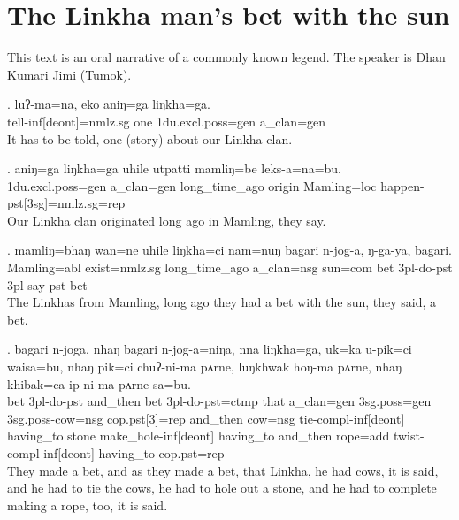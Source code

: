 ﻿%


\section*{The Linkha man's bet with the sun} 

\noindent This text is an oral narrative of a commonly known legend. The speaker is Dhan Kumari Jimi (Tumok).

\setcounter{ExNo}{0}

\exg. luʔ-ma=na, eko aniŋ=ga liŋkha=ga.\\
tell{\sc -inf[deont]=nmlz.sg} one {\sc 1du.excl.poss=gen} a\_clan{\sc=gen}\\
It has to be told, one (story) about our Linkha clan.


\exg. aniŋ=ga liŋkha=ga uhile utpatti mamliŋ=be leks-a=na=bu.\\
{\sc 1du.excl.poss=gen} a\_clan{\sc =gen} long\_time\_ago origin Mamling{\sc =loc} happen{\sc -pst[3sg]=nmlz.sg=rep}\\
Our Linkha clan originated long ago in Mamling, they say.


\exg. mamliŋ=bhaŋ wan=ne uhile liŋkha=ci nam=nuŋ bagari n-jog-a, ŋ-ga-ya, bagari.\\
Mamling{\sc =abl} exist{\sc [3sg]=nmlz.sg} long\_time\_ago a\_clan{\sc =nsg} {\sc sun=com} bet {\sc 3pl-}do{\sc -pst} {\sc 3pl-}say{\sc -pst} bet\\
The Linkhas from Mamling, long ago they had a bet with the sun, they said, a bet.


\exg. bagari n-joga, nhaŋ bagari n-jog-a=niŋa, nna liŋkha=ga, uk=ka u-pik=ci waisa=bu, nhaŋ pik=ci chuʔ-ni-ma pʌrne, luŋkhwak hoŋ-ma pʌrne, nhaŋ khibak=ca ip-ni-ma pʌrne sa=bu.\\
bet {\sc 3pl-}do{\sc -pst} and\_then bet {\sc 3pl-}do{\sc -pst=ctmp} that a\_clan{\sc =gen} {\sc 3sg.poss=gen} {\sc 3sg.poss-}cow{\sc =nsg} {\sc cop.pst[3]=rep} and\_then cow{\sc =nsg} tie{\sc -compl-inf[deont]} having\_to stone make\_hole{\sc -inf[deont]} having\_to and\_then rope{\sc =add} twist{\sc -compl-inf[deont]} having\_to {\sc cop.pst=rep}\\
They made a bet, and as they made a bet, that Linkha, he had cows, it is said, and he had to tie the cows, he had to hole out a stone, and he had to complete making a rope, too, it is said.


